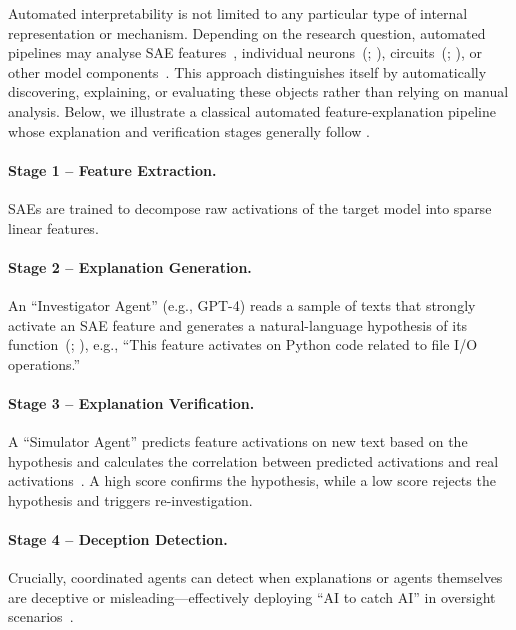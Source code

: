 Automated interpretability is not limited to any particular type of internal representation or mechanism. Depending on the research question, automated pipelines may analyse SAE features~, individual neurons~(; ), circuits~(; ), or other model components~. This approach distinguishes itself by automatically discovering, explaining, or evaluating these objects rather than relying on manual analysis. Below, we illustrate a classical automated feature-explanation pipeline whose explanation and verification stages generally follow .

\begin{practicebox}
\paragraph{Stage 1 -- Feature Extraction.} SAEs are trained to decompose raw activations of the target model into sparse linear features.\\

\paragraph{Stage 2 -- Explanation Generation.} An ``Investigator Agent'' (e.g., GPT-4) reads a sample of texts that strongly activate an SAE feature and generates a natural-language hypothesis of its function~(; ), e.g., ``This feature activates on Python code related to file I/O operations.''\\

\paragraph{Stage 3 -- Explanation Verification.} A ``Simulator Agent'' predicts feature activations on new text based on the hypothesis and calculates the correlation between predicted activations and real activations~. A high score confirms the hypothesis, while a low score rejects the hypothesis and triggers re-investigation.\\

\paragraph{Stage 4 -- Deception Detection.} Crucially, coordinated agents can detect when explanations or agents themselves are deceptive or misleading---effectively deploying ``AI to catch AI'' in oversight scenarios~.
\end{practicebox}

